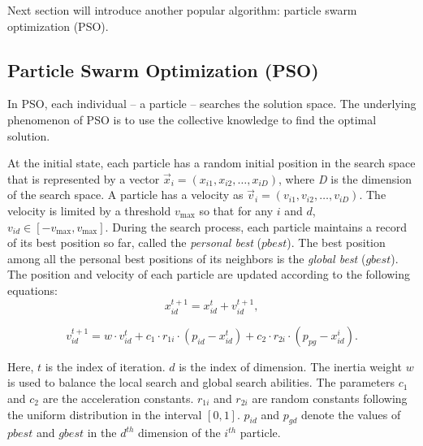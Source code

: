 Next section will introduce another popular algorithm: particle swarm optimization (PSO). 



\subsection{Particle Swarm Optimization (PSO)}
 In PSO, each individual -- a particle -- searches the solution space. The underlying phenomenon of PSO is to use the collective knowledge to find the optimal solution.

 At the initial state, each particle has a random initial position in the search space that is represented by a vector $\vec{x}_i = (x_{i1}, x_{i2}, \dots, x_{iD})$, where \emph{D} is the dimension of the search space. A particle has a velocity as $\vec{v}_i = (v_{i1}, v_{i2}, \dots, v_{iD})$. The velocity is limited by a threshold $v_{\max}$ so that for any $i$ and $d$, $v_{id} \in [-v_{\max}, v_{\max}]$. During the search process, each particle maintains a record of its best position so far, called the \emph{personal best} ($pbest$). The best position among all the personal best positions of its neighbors is the \emph{global best} ($gbest$). The position and velocity of each particle are updated according to the following equations:
\begin{equation}
\label{eq:updatePosition}
x^{t+1}_{id} = x^{t}_{id} + v^{t+1}_{id},
\end{equation}

\begin{equation}
\label{eq:updateVelocity}
v^{t+1}_{id} = w \cdot v^{t}_{id} + c_1 \cdot r_{1i} \cdot (p_{id} - x^t_{id}) + c_2 \cdot r_{2i} \cdot (p_{pg} - x^i_{id}).
\end{equation}

Here, $t$ is the index of iteration. $d$ is the index of dimension. The inertia weight $w$ is used to balance the local search and global search abilities. The parameters $c_1$ and $c_2$ are the acceleration constants. $r_{1i}$ and $r_{2i}$ are random constants following the uniform distribution in the interval $[0, 1]$. $p_{id}$ and $p_{gd}$ denote the values of $pbest$ and $gbest$ in the $d^{th}$ dimension of the $i^{th}$ particle.


